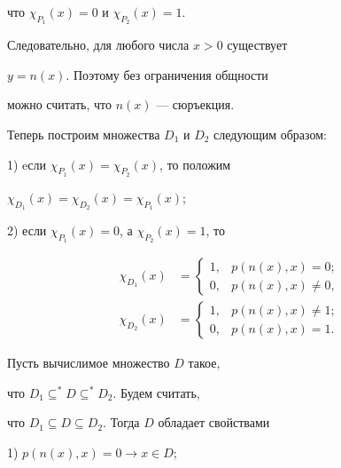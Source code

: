 \begin{pf}
что $\chi_{P_1}(x)=0$ и $\chi_{P_2}(x)=1$.


Следовательно, для любого числа $x>0$ существует


$y=n(x)$. Поэтому без ограничения общности


можно считать, что $n(x)$ --- сюръекция.





Теперь построим множества $D_1$ и $D_2$ следующим образом:





1) eсли $\chi_{P_1}(x)=\chi_{P_2}(x)$, то положим


$\chi_{D_1}(x)=\chi_{D_2}(x)=\chi_{P_1}(x)$;





2) если $\chi_{P_1}(x)=0$, а $\chi_{P_2}(x)=1$, то


\begin{align*}


\chi_{D_1}(x)&=


\begin{cases}


1, & p(n(x),x)=0; \\


0, & p(n(x),x)\ne0,


\end{cases}


\\


\chi_{D_2}(x)&=


\begin{cases}


1, & p(n(x),x)\ne1; \\


0, & p(n(x),x)=1.


\end{cases}


\end{align*}





Пусть вычислимое множество $D$ такое, 


что $D_1\subseteq^*D\subseteq^*D_2$. Будем считать,


что $D_1\subseteq D\subseteq D_2$. Тогда $D$ обладает свойствами





1) $p(n(x),x)=0\rightarrow x\in D$;






\end{pf}
